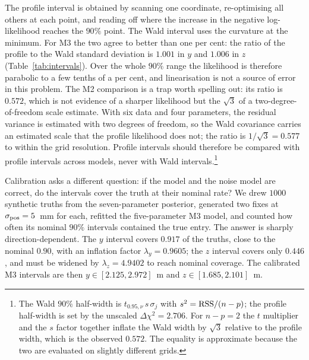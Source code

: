 The profile interval is obtained by scanning one coordinate, re-optimising all
others at each point, and reading off where the increase in the negative
log-likelihood reaches the $90\%$ point. The Wald interval uses the curvature at
the minimum. For M3 the two agree to better than one per cent: the ratio of the
profile to the Wald standard deviation is $1.001$ in $y$ and $1.006$ in $z$
(Table~\ref{tab:intervals}). Over the whole $90\%$ range the likelihood is
therefore parabolic to a few tenths of a per cent, and linearisation is not a
source of error in this problem. The M2 comparison is a trap worth spelling out:
its ratio is $0.572$, which is not evidence of a sharper likelihood but the
$\sqrt{3}$ of a two-degree-of-freedom scale estimate. With six data and four
parameters, the residual variance is estimated with two degrees of freedom, so the
Wald covariance carries an estimated scale that the profile likelihood does not;
the ratio is $1/\sqrt{3}=0.577$ to within the grid resolution. Profile intervals
should therefore be compared with profile intervals across models, never with Wald
intervals.\footnote{The Wald $90\%$ half-width is $t_{0.95,\nu}\,s\,\sigma_j$ with
$s^2={\rm RSS}/(n-p)$; the profile half-width is set by the unscaled
$\Delta\chi^2=2.706$. For $n-p=2$ the $t$ multiplier and the $s$ factor together
inflate the Wald width by $\sqrt{3}$ relative to the profile width, which is the
observed $0.572$. The equality is approximate because the two are evaluated on
slightly different grids.}

Calibration asks a different question: if the model and the noise model are
correct, do the intervals cover the truth at their nominal rate? We drew $1000$
synthetic truths from the seven-parameter posterior, generated two fixes at
$\sigma_{\rm pos}=5$~mm for each, refitted the five-parameter M3 model, and
counted how often its nominal $90\%$ intervals contained the true entry. The
answer is sharply direction-dependent. The $y$ interval covers $0.917$ of the
truths, close to the nominal $0.90$, with an inflation factor
$\lambda_y=0.9605$; the $z$ interval covers only $0.446$, and must be widened by
$\lambda_z=4.9402$ to reach nominal coverage. The calibrated M3 intervals are then
$y\in[2.125,2.972]$~m and $z\in[1.685,2.101]$~m.

